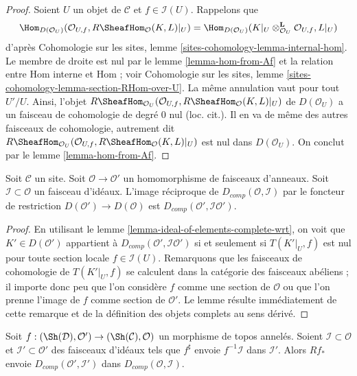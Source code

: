 \begin{proof}
Soient $U$ un objet de $\mathcal{C}$ et $f \in \mathcal{I}(U)$.
Rappelons que
$$
\Hom_{D(\mathcal{O}_U)}(\mathcal{O}_{U, f}, R\SheafHom_\mathcal{O}(K, L)|_U)
=
\Hom_{D(\mathcal{O}_U)}(
K|_U \otimes_{\mathcal{O}_U}^\mathbf{L} \mathcal{O}_{U, f}, L|_U)
$$
d'après Cohomologie sur les sites, lemme \ref{sites-cohomology-lemma-internal-hom}.
Le membre de droite est nul par le lemme \ref{lemma-hom-from-Af}
et la relation entre Hom interne et Hom ; voir
Cohomologie sur les sites, lemme \ref{sites-cohomology-lemma-section-RHom-over-U}.
La même annulation vaut pour tout $U'/U$. Ainsi, l'objet
$R\SheafHom_{\mathcal{O}_U}(\mathcal{O}_{U, f},
R\SheafHom_\mathcal{O}(K, L)|_U)$ de $D(\mathcal{O}_U)$ a un faisceau de cohomologie
de degré $0$ nul (loc. cit.). Il en va de même des autres
faisceaux de cohomologie, autrement dit $R\SheafHom_{\mathcal{O}_U}(\mathcal{O}_{U, f},
R\SheafHom_\mathcal{O}(K, L)|_U)$ est nul dans $D(\mathcal{O}_U)$.
On conclut par le lemme \ref{lemma-hom-from-Af}.
\end{proof}

\begin{lemma}
\label{lemma-restriction-derived-complete}
Soit $\mathcal{C}$ un site. Soit $\mathcal{O} \to \mathcal{O}'$
un homomorphisme de faisceaux d'anneaux. Soit $\mathcal{I} \subset \mathcal{O}$
un faisceau d'idéaux. L'image réciproque de $D_{comp}(\mathcal{O}, \mathcal{I})$
par le foncteur de restriction $D(\mathcal{O}') \to D(\mathcal{O})$ est
$D_{comp}(\mathcal{O}', \mathcal{I}\mathcal{O}')$.
\end{lemma}

\begin{proof}
En utilisant le lemme \ref{lemma-ideal-of-elements-complete-wrt},
on voit que $K' \in D(\mathcal{O}')$ appartient à
$D_{comp}(\mathcal{O}', \mathcal{I}\mathcal{O}')$
si et seulement si $T(K'|_U, f)$ est nul pour toute section locale
$f \in \mathcal{I}(U)$. Remarquons que les faisceaux de cohomologie de
$T(K'|_U, f)$ se calculent dans la catégorie des faisceaux abéliens ;
il importe donc peu que l'on considère $f$ comme une section de
$\mathcal{O}$ ou que l'on prenne l'image de $f$ comme section de $\mathcal{O}'$.
Le lemme résulte immédiatement de cette remarque et de la
définition des objets complets au sens dérivé.
\end{proof}

\begin{lemma}
\label{lemma-pushforward-derived-complete}
Soit $f : (\Sh(\mathcal{D}), \mathcal{O}') \to (\Sh(\mathcal{C}), \mathcal{O})$
un morphisme de topos annelés. Soient $\mathcal{I} \subset \mathcal{O}$
et $\mathcal{I}' \subset \mathcal{O}'$ des faisceaux d'idéaux tels
que $f^\sharp$ envoie $f^{-1}\mathcal{I}$ dans $\mathcal{I}'$.
Alors $Rf_*$ envoie $D_{comp}(\mathcal{O}', \mathcal{I}')$
dans $D_{comp}(\mathcal{O}, \mathcal{I})$.
\end{lemma}

